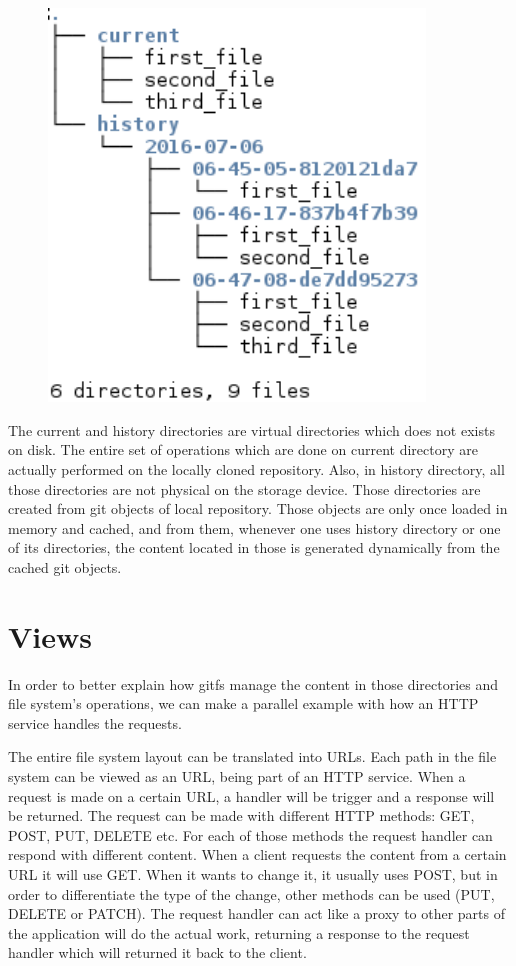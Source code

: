 \begin{figure}[h]
  \begin{center}
    \includegraphics[width=10cm]{layout/gitfs_layout.png}
  \end{center}
\end{figure}

The current and history directories are virtual directories which does not exists on disk. The entire set of operations which are done on current directory are actually performed on the locally cloned repository. Also, in history directory, all those directories are not physical on the storage device. Those directories are created from git objects of local repository. Those objects are only once loaded in memory and cached, and from them, whenever one uses history directory or one of its directories, the content located in those is generated dynamically from the cached git objects.

\section{Views}
In order to better explain how gitfs manage the content in those directories and file system's operations, we can make a parallel example with how an HTTP service handles the requests. 

The entire file system layout can be translated into URLs. Each path in the file system can be viewed as an URL, being part of an HTTP service. When a request is made on a certain URL, a handler will be trigger and a response will be returned. The request can be made with different HTTP methods: GET, POST, PUT, DELETE etc. For each of those methods the request handler can respond with different content. When a client requests the content from a certain URL it will use GET. When it wants to change it, it usually uses POST, but in order to differentiate the type of the change, other methods can be used (PUT, DELETE or PATCH). The request handler can act like a proxy to other parts of the application will do the actual work, returning a response to the request handler which will returned it back to the client.

